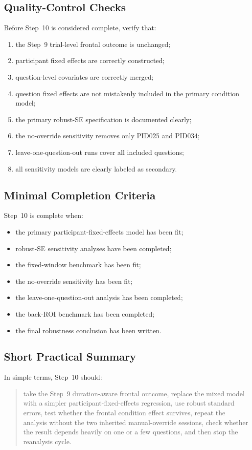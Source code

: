 \subsection{Quality-Control Checks}
Before Step~10 is considered complete, verify that:
\begin{enumerate}
    \item the Step~9 trial-level frontal outcome is unchanged;
    \item participant fixed effects are correctly constructed;
    \item question-level covariates are correctly merged;
    \item question fixed effects are not mistakenly included in the primary condition model;
    \item the primary robust-SE specification is documented clearly;
    \item the no-override sensitivity removes only PID025 and PID034;
    \item leave-one-question-out runs cover all included questions;
    \item all sensitivity models are clearly labeled as secondary.
\end{enumerate}

\subsection{Minimal Completion Criteria}
Step~10 is complete when:
\begin{itemize}
    \item the primary participant-fixed-effects model has been fit;
    \item robust-SE sensitivity analyses have been completed;
    \item the fixed-window benchmark has been fit;
    \item the no-override sensitivity has been fit;
    \item the leave-one-question-out analysis has been completed;
    \item the back-ROI benchmark has been completed;
    \item the final robustness conclusion has been written.
\end{itemize}

\subsection{Short Practical Summary}
In simple terms, Step~10 should:
\begin{quote}
take the Step~9 duration-aware frontal outcome, replace the mixed model with a simpler
participant-fixed-effects regression, use robust standard errors, test whether the frontal
condition effect survives, repeat the analysis without the two inherited manual-override sessions,
check whether the result depends heavily on one or a few questions, and then stop the reanalysis cycle.
\end{quote}